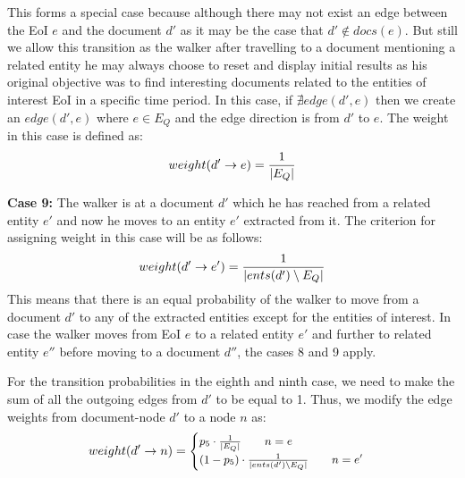 \documentclass{article}
\begin{document}
\vspace{2mm}\noindent
This forms a special case because although there may not exist
an edge between the EoI $e$ and the document $d'$ as it may be the case
that $d' \notin docs(e) $. But still we allow this transition as the walker after 
travelling to a document mentioning a related entity he may always choose to reset
and display initial results as his original objective was to find interesting 
documents related to the entities of interest EoI in a specific time period.
In this case, if $\nexists edge(d', e)$ then we create an
$edge (d', e)$ where $e \in E_Q$ 
and the edge direction is from $d'$ to $e$. 
The weight in this case is defined as:
\begin{equation}
\begin{split}
\small
weight(d' \rightarrow e) = \frac{1}{|E_Q|} 
\end{split}
\end{equation}

\vspace{2mm}\noindent
{\bf Case 9:} The walker is at a document $d'$ which he has reached from a related
entity $e'$ and now he moves to an entity $e'$ extracted from it. 
The criterion for assigning weight in this case will be as follows:
\begin{equation}
\begin{split}
\small
weight(d' \rightarrow e') = \frac{1}{|ents(d') \setminus E_Q|} 
\end{split}
\end{equation}
This means that there is an equal probability of the walker to move from 
a document $d'$ to any of the extracted entities except for the entities of 
interest. In case the walker moves from EoI $e$ to a related entity $e'$ and further 
to related entity $e''$ before moving to a document $d''$, the cases 8 and 9 apply.

\vspace{2mm}\noindent
For the transition probabilities in the eighth and ninth case, we need to 
make the sum of all the outgoing edges from $d'$ to be equal to 1. 
Thus, we modify the edge weights from document-node $d'$ to a node $n$ as:
\begin{gather}
\small
weight(d' \rightarrow n) = \begin{cases}
    p_5 \cdot \frac{1}{|E_Q|} \qquad n = e\\
    (1-p_5) \cdot \frac{1}{|ents(d') \setminus E_Q|}\qquad n = e'
\end{cases}
\end{gather}
\end{document}
